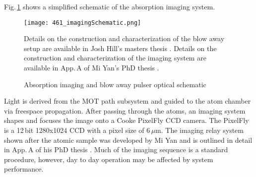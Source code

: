 Fig.\,\ref{fig:absImagingSchematic} shows a simplified schematic of the absorption imaging system.
	\begin{figure} 
		\centerline{
		\texttt{[image: 461\_imagingSchematic.png]}}
		\caption{Absorption imaging and blow away pulser optical schematic}{Details on the construction and characterization of the blow away setup are available in Josh Hill's masters thesis \cite{Hill2017}. Details on the construction and characterization of the imaging system are available in App.\,A of Mi Yan's PhD thesis \cite{Yan2013d}.}
		\label{fig:absImagingSchematic}
	\end{figure}
Light is derived from the MOT path subsystem and guided to the atom chamber via freespace propagation. 
After passing through the atoms, an imaging system shapes and focuses the image onto a Cooke PixelFly CCD camera.
The PixelFly is a 12\,bit 1280x1024 CCD with a pixel size of 6\,$\mu$m.
The imaging relay system shown after the atomic sample was developed by Mi Yan and is outlined in detail in App.\,A of his PhD thesis \cite{Yan2013d}. 
Much of the imaging sequence is a standard procedure, however, day to day operation may be affected by system performance.




